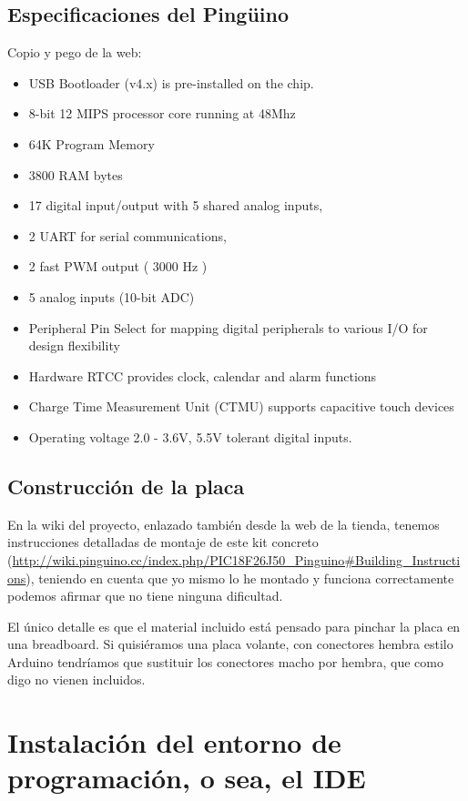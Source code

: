\documentclass[12pt,a4paper,twoside,DIV=15]{scrartcl}
\begin{document}
\subsection{Especificaciones del Pingüino}
\label{sec:especificaciones}

Copio y pego de la web:
\begin{itemize}
\item USB Bootloader (v4.x) is pre-installed on the chip.
\item 8-bit 12 MIPS processor core running at 48Mhz
\item 64K Program Memory
\item 3800 RAM bytes
\item 17 digital input/output with 5 shared analog inputs,
\item 2 UART for serial communications,
\item 2 fast PWM output ( 3000 Hz )
\item 5 analog inputs (10-bit ADC)
\item Peripheral Pin Select for mapping digital peripherals to various I/O for design flexibility
\item Hardware RTCC provides clock, calendar and alarm functions
\item Charge Time Measurement Unit (CTMU) supports capacitive touch devices
\item Operating voltage 2.0 - 3.6V, 5.5V tolerant digital inputs.
\end{itemize}

\subsection{Construcción de la placa}
\label{sec:pcb_montaje}

En la wiki del proyecto, enlazado también desde la web de la tienda,
tenemos instrucciones detalladas de montaje de este kit concreto
(\url{http://wiki.pinguino.cc/index.php/PIC18F26J50_Pinguino#Building_Instructions}),
teniendo en cuenta que yo mismo lo he montado y funciona correctamente
podemos afirmar que no tiene ninguna dificultad.

El único detalle es que el material incluido está pensado para pinchar
la placa en una breadboard. Si quisiéramos una placa volante, con
conectores hembra estilo Arduino tendríamos que sustituir los
conectores macho por hembra, que como digo no vienen incluidos. 


\section{Instalación del entorno de programación, o sea, el IDE}
\label{sec:instala_ide}
\end{document}
